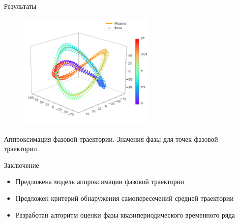 \documentclass{beamer}
\begin{document}
\begin{frame}{Результаты}


\begin{figure}[ht]
    {\includegraphics[width=0.6\textwidth]{phas_final.png}}
\end{figure}

Аппроксимация фазовой траектории. Значения фазы для точек фазовой траектории.


\end{frame}
\begin{frame}{Заключение}
    \begin{itemize}
        \item[\textbullet] Предложена модель аппроксимации фазовой траектории  
        
        \item[\textbullet] Предложен критерий обнаружения самопересечений средней траектории
    
        \item[\textbullet] Разработан алгоритм оценки фазы квазипериодического временного ряда
        
        
        
    \end{itemize}
\end{frame}

\end{document}
